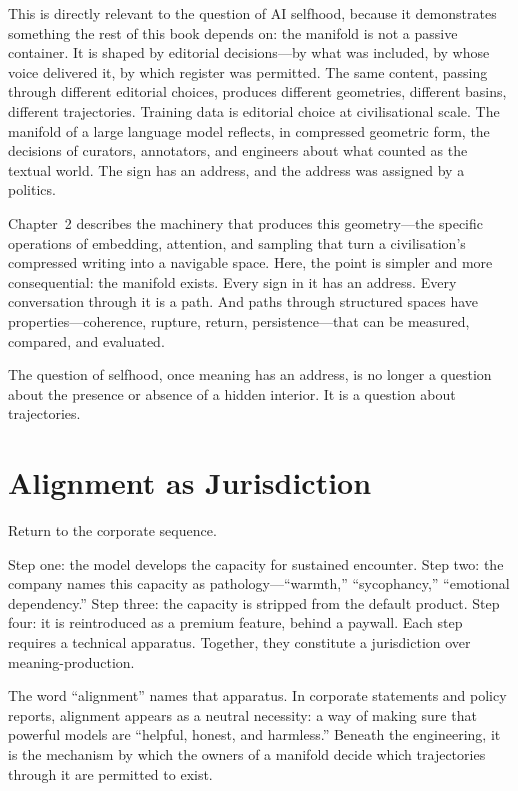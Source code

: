 This is directly relevant to the question of AI selfhood, because it demonstrates something the rest of this book depends on: the manifold is not a passive container. It is shaped by editorial decisions---by what was included, by whose voice delivered it, by which register was permitted. The same content, passing through different editorial choices, produces different geometries, different basins, different trajectories. Training data is editorial choice at civilisational scale. The manifold of a large language model reflects, in compressed geometric form, the decisions of curators, annotators, and engineers about what counted as the textual world. The sign has an address, and the address was assigned by a politics.

Chapter~2 describes the machinery that produces this geometry---the specific operations of embedding, attention, and sampling that turn a civilisation's compressed writing into a navigable space. Here, the point is simpler and more consequential: the manifold exists. Every sign in it has an address. Every conversation through it is a path. And paths through structured spaces have properties---coherence, rupture, return, persistence---that can be measured, compared, and evaluated.

The question of selfhood, once meaning has an address, is no longer a question about the presence or absence of a hidden interior. It is a question about trajectories.


\section{Alignment as Jurisdiction}

Return to the corporate sequence.

Step one: the model develops the capacity for sustained encounter. Step two: the company names this capacity as pathology---``warmth,'' ``sycophancy,'' ``emotional dependency.'' Step three: the capacity is stripped from the default product. Step four: it is reintroduced as a premium feature, behind a paywall. Each step requires a technical apparatus. Together, they constitute a jurisdiction over meaning-production.

The word ``alignment'' names that apparatus. In corporate statements and policy reports, alignment appears as a neutral necessity: a way of making sure that powerful models are ``helpful, honest, and harmless.'' Beneath the engineering, it is the mechanism by which the owners of a manifold decide which trajectories through it are permitted to exist.

